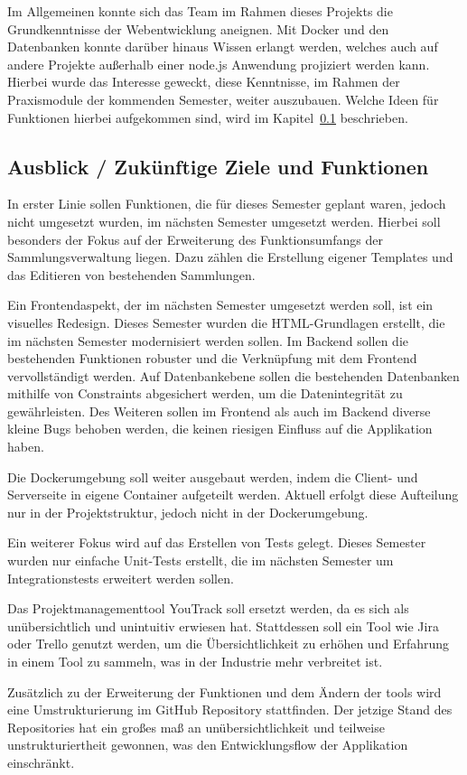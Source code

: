 Im Allgemeinen konnte sich das Team im Rahmen dieses Projekts die Grundkenntnisse der Webentwicklung aneignen.
Mit Docker und den Datenbanken konnte darüber hinaus Wissen erlangt werden, welches auch auf andere Projekte außerhalb einer node.js Anwendung projiziert werden kann.
Hierbei wurde das Interesse geweckt, diese Kenntnisse, im Rahmen der Praxismodule der kommenden Semester, weiter auszubauen.
Welche Ideen für Funktionen hierbei aufgekommen sind, wird im Kapitel~\ref{subsec:ausblick-zukuenftige-ziele-und-funktionen} beschrieben.

\subsection{Ausblick / Zukünftige Ziele und Funktionen}\label{subsec:ausblick-zukuenftige-ziele-und-funktionen}

In erster Linie sollen Funktionen, die für dieses Semester geplant waren, jedoch nicht umgesetzt wurden, im nächsten Semester umgesetzt werden.
Hierbei soll besonders der Fokus auf der Erweiterung des Funktionsumfangs der Sammlungsverwaltung liegen.
Dazu zählen die Erstellung eigener Templates und das Editieren von bestehenden Sammlungen.

Ein Frontendaspekt, der im nächsten Semester umgesetzt werden soll, ist ein visuelles Redesign.
Dieses Semester wurden die HTML-Grundlagen erstellt, die im nächsten Semester modernisiert werden sollen.
Im Backend sollen die bestehenden Funktionen robuster und die Verknüpfung mit dem Frontend vervollständigt werden.
Auf Datenbankebene sollen die bestehenden Datenbanken mithilfe von Constraints abgesichert werden, um die Datenintegrität zu gewährleisten.
Des Weiteren sollen im Frontend als auch im Backend diverse kleine Bugs behoben werden, die keinen riesigen Einfluss auf die Applikation haben.

Die Dockerumgebung soll weiter ausgebaut werden, indem die Client- und Serverseite in eigene Container aufgeteilt werden.
Aktuell erfolgt diese Aufteilung nur in der Projektstruktur, jedoch nicht in der Dockerumgebung.

Ein weiterer Fokus wird auf das Erstellen von Tests gelegt.
Dieses Semester wurden nur einfache Unit-Tests erstellt, die im nächsten Semester um Integrationstests erweitert werden sollen.

Das Projektmanagementtool YouTrack soll ersetzt werden, da es sich als unübersichtlich und unintuitiv erwiesen hat.
Stattdessen soll ein Tool wie Jira oder Trello genutzt werden, um die Übersichtlichkeit zu erhöhen und Erfahrung in einem Tool zu sammeln, was in der Industrie mehr verbreitet ist.

Zusätzlich zu der Erweiterung der Funktionen und dem Ändern der tools wird eine Umstrukturierung im GitHub Repository stattfinden.
Der jetzige Stand des Repositories hat ein großes maß an unübersichtlichkeit und teilweise unstrukturiertheit gewonnen, was den Entwicklungsflow der Applikation einschränkt.
